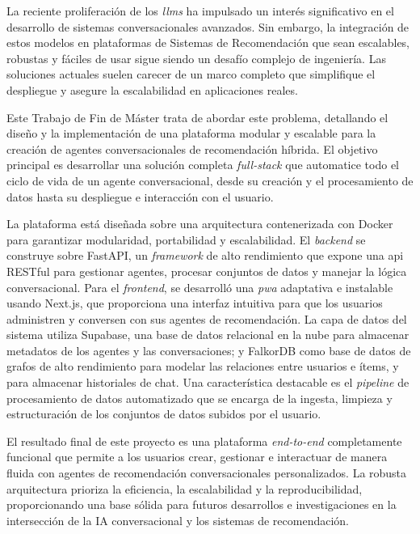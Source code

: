 La reciente proliferación de los \textit{\acp{llm}} ha impulsado un interés significativo en el desarrollo de sistemas conversacionales avanzados. Sin embargo, la integración de estos modelos en plataformas de Sistemas de Recomendación que sean escalables, robustas y fáciles de usar sigue siendo un desafío complejo de ingeniería. Las soluciones actuales suelen carecer de un marco completo que simplifique el despliegue y asegure la escalabilidad en aplicaciones reales.

Este Trabajo de Fin de Máster trata de abordar este problema, detallando el diseño y la implementación de una plataforma modular y escalable para la creación de agentes conversacionales de recomendación híbrida. El objetivo principal es desarrollar una solución completa \textit{full-stack} que automatice todo el ciclo de vida de un agente conversacional, desde su creación y el procesamiento de datos hasta su despliegue e interacción con el usuario.

La plataforma está diseñada sobre una arquitectura contenerizada con Docker para garantizar modularidad, portabilidad y escalabilidad. El \textit{backend} se construye sobre FastAPI, un \textit{framework} de alto rendimiento que expone una \ac{api} RESTful para gestionar agentes, procesar conjuntos de datos y manejar la lógica conversacional. Para el \textit{frontend}, se desarrolló una \textit{\ac{pwa}} adaptativa e instalable usando Next.js, que proporciona una interfaz intuitiva para que los usuarios administren y conversen con sus agentes de recomendación. La capa de datos del sistema utiliza Supabase, una base de datos relacional en la nube para almacenar metadatos de los agentes y las conversaciones; y FalkorDB como base de datos de grafos de alto rendimiento para modelar las relaciones entre usuarios e ítems, y para almacenar historiales de chat. Una característica destacable es el \textit{pipeline} de procesamiento de datos automatizado que se encarga de la ingesta, limpieza y estructuración de los conjuntos de datos subidos por el usuario.

El resultado final de este proyecto es una plataforma \textit{end-to-end} completamente funcional que permite a los usuarios crear, gestionar e interactuar de manera fluida con agentes de recomendación conversacionales personalizados. La robusta arquitectura prioriza la eficiencia, la escalabilidad y la reproducibilidad, proporcionando una base sólida para futuros desarrollos e investigaciones en la intersección de la IA conversacional y los sistemas de recomendación.

